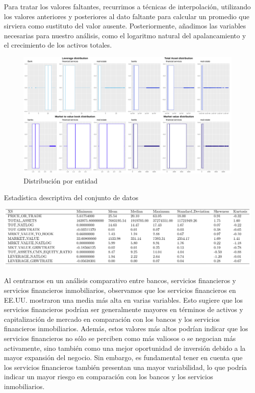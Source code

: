 \documentclass[a4paper,fleqn]{cas-sc}
\begin{document}
Para tratar los valores faltantes, recurrimos a técnicas de interpolación, utilizando los valores anteriores y posteriores al dato faltante para calcular un promedio que sirviera como sustituto del valor ausente. Posteriormente, añadimos las variables necesarias para nuestro análisis, como el logaritmo natural del apalancamiento y el crecimiento de los activos totales.

\begin{figure}[h]
    \centering
    \caption{Distribución por entidad}
    \includegraphics[width=1\textwidth]{gr1.png}
\end{figure}

\begin{table}[h]
    \centering
    \caption{Estadística descriptiva del conjunto de datos}
    \includegraphics[width=1\textwidth]{tabla1.png}
\end{table}

Al centrarnos en un análisis comparativo entre bancos, servicios financieros y servicios financieros inmobiliarios, observamos que los servicios financieros en EE.UU. mostraron una media más alta en varias variables. Esto sugiere que los servicios financieros podrían ser generalmente mayores en términos de activos y capitalización de mercado en comparación con los bancos y los servicios financieros inmobiliarios. Además, estos valores más altos podrían indicar que los servicios financieros no sólo se perciben como más valiosos o se negocian más activamente, sino también como una mejor oportunidad de inversión debido a la mayor expansión del negocio. Sin embargo, es fundamental tener en cuenta que los servicios financieros también presentan una mayor variabilidad, lo que podría indicar un mayor riesgo en comparación con los bancos y los servicios inmobiliarios.
\end{document}

